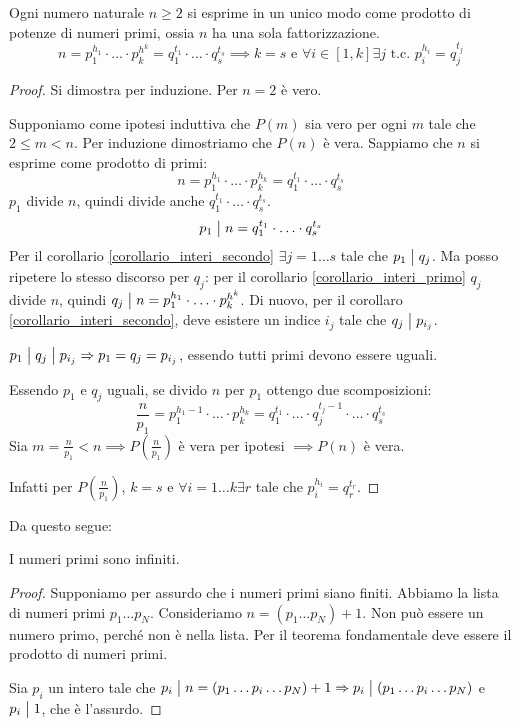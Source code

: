 \begin{theorem}
Ogni numero naturale $n \ge 2$ si esprime in un unico modo come prodotto di potenze di numeri primi, ossia $n$ ha una sola fattorizzazione.
\[
n = p_{1}^{h_1} \cdot \ldots \cdot p_{k}^{h^k} = q_{1}^{t_1} \cdot \ldots \cdot q_{s}^{t_s} \implies k = s \text{ e } \forall i \in [1, k] \exists j \text{ t.c. } p_i^{h_i} = q_j^{t_j}
\]
\end{theorem}
\begin{proof}
Si dimostra per induzione. Per $n = 2$ \`e vero.

Supponiamo come ipotesi induttiva che $P(m)$ sia vero per ogni $m$ tale che $2 \le m < n$. Per induzione dimostriamo che $P(n)$ \`e vera. Sappiamo che $n$ si esprime come prodotto di primi:
\[
n = p_{1}^{h_1} \cdot \ldots \cdot p_{k}^{h_k} = q_{1}^{t_1} \cdot \ldots \cdot q_{s}^{t_s}
\]
$p_1$ divide $n$, quindi divide anche $q_{1}^{t_1} \cdot \ldots \cdot q_{s}^{t_s}$.
\[
p_1 \bigm| n = q_{1}^{t_1} \cdot \ldots \cdot q_{s}^{t_s}
\]
Per il corollario \ref{corollario_interi_secondo} $\exists j = 1 \ldots s$ tale che $p_1 \bigm| q_j$. Ma posso ripetere lo stesso discorso per $q_j$: per il corollario \ref{corollario_interi_primo} $q_j$ divide $n$, quindi $q_j \bigm| n = p_{1}^{h_1} \cdot \ldots \cdot p_{k}^{h^k}$. Di nuovo, per il corollaro \ref{corollario_interi_secondo}, deve esistere un indice $i_j$ tale che $q_j \bigm| p_{i_j}$.

$p_1 \bigm| q_j \bigm| p_{i_j} \Rightarrow p_1 = q_j = p_{i_j} $, essendo tutti primi devono essere uguali.

Essendo $p_1$ e $q_j$ uguali, se divido $n$ per $p_1$ ottengo due scomposizioni:
\[
\frac{n}{p_1} = p_{1}^{h_1 - 1} \cdot \ldots \cdot p_{k}^{h_k} = q_{1}^{t_1} \cdot \ldots \cdot q_{j}^{t_j - 1} \cdot \ldots \cdot q_{s}^{t_s}
\]
Sia $m = \frac{n}{p_1} < n \implies P \left(\frac{n}{p_1} \right)$ \`e vera per ipotesi $\implies P(n)$ \`e vera.

Infatti per $P \left( \frac{n}{p_1} \right)$, $ k = s$ e $\forall i = 1 \ldots k \exists r$ tale che $p_i^{h_i} = q_r^{t_r}$.
\end{proof}

Da questo segue:
\begin{theorem}
I numeri primi sono infiniti.
\end{theorem}
\begin{proof}
Supponiamo per assurdo che i numeri primi siano finiti. Abbiamo la lista di numeri primi $p_1 \dots p_N$. Consideriamo $n = (p_1 \dots p_N) + 1$. Non pu\`o essere un numero primo, perch\'e non \`e nella lista. Per il teorema fondamentale deve essere il prodotto di numeri primi.

Sia $p_i$ un intero tale che $p_i \bigm| n = (p_1 \dots p_i \dots p_N) + 1 \Rightarrow p_i \bigm| (p_1 \dots p_i \dots p_N)$ e $p_i \bigm| 1$, che \`e l'assurdo.
\end{proof}

